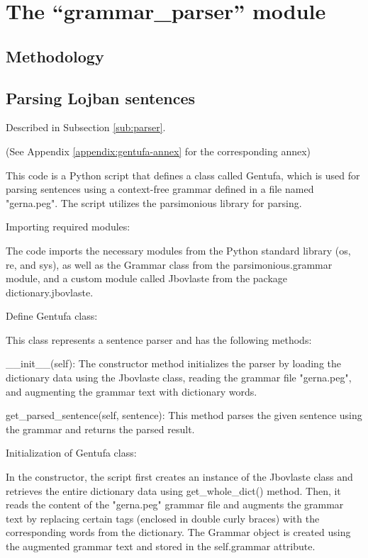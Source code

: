 \chapter{The ``grammar_parser'' module}

\section{Methodology}

\section{Parsing Lojban sentences}
\label{sec:parsing_lojban_sentences}

Described in Subsection \ref{sub:parser}.



(See Appendix \ref{appendix:gentufa-annex} for the corresponding annex)

This code is a Python script that defines a class called Gentufa, which is used for parsing sentences using a context-free grammar defined in a file named "gerna.peg". The script utilizes the parsimonious library for parsing.

Importing required modules:

The code imports the necessary modules from the Python standard library (os, re, and sys), as well as the Grammar class from the parsimonious.grammar module, and a custom module called Jbovlaste from the package dictionary.jbovlaste.

Define Gentufa class:

This class represents a sentence parser and has the following methods:

    \_\_init\_\_(self): The constructor method initializes the parser by loading the dictionary data using the Jbovlaste class, reading the grammar file "gerna.peg", and augmenting the grammar text with dictionary words.

    get\_parsed\_sentence(self, sentence): This method parses the given sentence using the grammar and returns the parsed result.

Initialization of Gentufa class:

In the constructor, the script first creates an instance of the Jbovlaste class and retrieves the entire dictionary data using get\_whole\_dict() method. Then, it reads the content of the "gerna.peg" grammar file and augments the grammar text by replacing certain tags (enclosed in double curly braces) with the corresponding words from the dictionary. The Grammar object is created using the augmented grammar text and stored in the self.grammar attribute.


